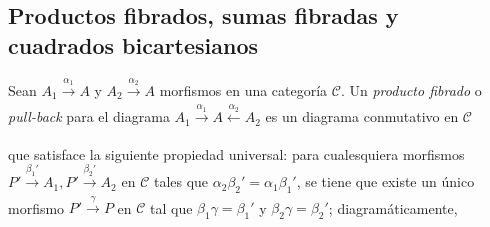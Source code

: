 \documentclass[tesis]{subfiles}
\begin{document}
\subsection*{Productos fibrados, sumas fibradas y cuadrados bicartesianos} \label{Mendoza-1.2}

\begin{Def}
    Sean $A_1\xrightarrow[]{\alpha_1} A$ y $A_2\xrightarrow[]{\alpha_2} A$ morfismos en una categoría $\mathscr{C}$. Un \emph{producto fibrado} o \emph{pull-back} para el diagrama $A_1\xrightarrow[]{\alpha_1}A\xleftarrow[]{\alpha_2}A_2$ es un diagrama conmutativo en $\mathscr{C}$
    \begin{center}
    \end{center}
    que satisface la siguiente propiedad universal: para cualesquiera morfismos $P'\xrightarrow[]{\beta_1'} A_1, P'\xrightarrow[]{\beta_2'} A_2$ en $\mathscr{C}$ tales que $\alpha_2\beta_2' = \alpha_1\beta_1'$, se tiene que existe un único morfismo $P'\xrightarrow[]{\gamma} P$ en $\mathscr{C}$ tal que $\beta_1\gamma = \beta_1'$ y $\beta_2\gamma = \beta_2'$; diagramáticamente,
    \begin{center}
    \end{center}
\end{Def}
\end{document}
